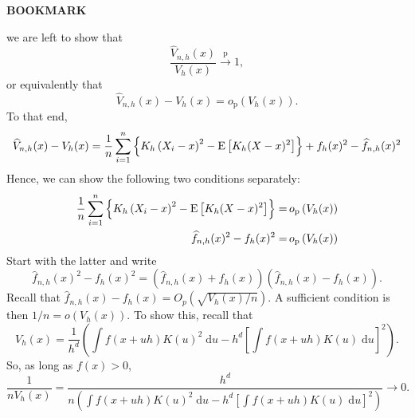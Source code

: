 
\textbf{BOOKMARK}

we are left to show
that
\begin{equation*}
  \frac{\widehat{V}_{n, h} (x)}{V_{h} (x)} \overset{\mathrm{p}}{\to} 1,
\end{equation*}
or equivalently that
\begin{equation*}
  \widehat{V}_{n, h} (x) - V_{h} (x) = o_{\mathrm{p}} \left( V_{h} (x) \right).
\end{equation*}
To that end,
\begin{equation*}
  \widehat{V}_{n, h} (x) - V_{h} (x) = \frac{1}{n} \sum_{i = 1}^{n} \left\{
  K_{h} \left( X_{i} - x \right)^{2} - \mathrm{E} \left[ K_{h} (X - x)^{2} \right]
  \right\} + f_{h} (x)^{2} - \widehat{f}_{n, h} (x)^{2}
\end{equation*}
Hence, we can show the following two conditions separately:
\begin{align}
  \frac{1}{n} \sum_{i = 1}^{n} \left\{
  K_{h} \left( X_{i} - x \right)^{2} - \mathrm{E} \left[ K_{h} (X - x)^{2} \right]
  \right\} =
  & \,  o_{\mathrm{p}} \left( V_{h} (x) \right) \\
  \widehat{f}_{n, h} (x)^{2} - f_{h} (x)^{2} =
  & \, o_{\mathrm{p}} \left( V_{h} (x)
  \right)
\end{align}
Start with the latter and write
\begin{equation*}
  \widehat{f}_{n, h} (x)^{2} - f_{h} (x)^{2} = \left( \widehat{f}_{n, h} (x) +
  f_{h} (x) \right) \left( \widehat{f}_{n, h} (x) - f_{h} (x) \right).
\end{equation*}
Recall that \(\widehat{f}_{n, h} (x) - f_{h} (x) = O_{p} \left( \sqrt{V_{h} (x)
/ n} \right)\).
A sufficient condition is then \(1 / n = o \left( V_{h} (x) \right)\).
To show this, recall that
\begin{equation*}
  V_{h} (x) = \frac{1}{h^{d}} \left( \int f (x + u h) K (u)^{2} \; \mathrm{d} u
  - h^{d} \left[ \int f (x + u h) K (u) \; \mathrm{d} u \right]^{2} \right).
\end{equation*}
So, as long as \(f (x) > 0\),
\begin{equation*}
  \frac{1}{n V_{h} (x)} = \frac{h^{d}}{n \left( \int f (x + u h) K
  (u)^{2} \; \mathrm{d} u - h^{d} \left[ \int f (x + u h) K (u) \; \mathrm{d} u
  \right]^{2} \right)} \to 0.
\end{equation*}

